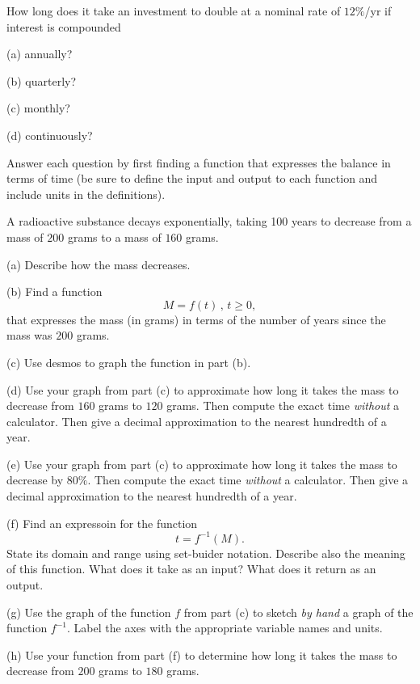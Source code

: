 \documentclass{ximera}
\begin{document}
\begin{question}  \label{Q:DLDFLLLLL}
How long does it take an investment to double at a nominal rate of $12\%$/yr if interest is compounded

(a) annually?

(b) quarterly?

(c) monthly?

(d) continuously?

Answer each question by first finding a function that expresses the balance in terms of time (be sure to define the input and output to each function and include units in the definitions).

\end{question}


\begin{question}  \label{Q:dfbhhhhh}
A radioactive substance decays exponentially, taking 100 years to decrease from a mass of $200$ grams to a mass of $160$ grams.

(a) Describe how the mass decreases.

(b)  Find a function 
\[
 M= f(t) \, , \, t\geq 0 ,
\]
that expresses the mass (in grams) in terms of the number of years since the mass was $200$ grams.

(c) Use desmos to graph the function in part (b). 

(d) Use your graph from part (c) to approximate how long it takes the mass to decrease from $160$ grams to $120$ grams. Then compute the exact time \emph{without} a calculator. Then give a decimal approximation to the nearest hundredth of a year.

(e) Use your graph from part (c) to approximate how long it takes the mass to decrease by $80\%$. Then compute the exact time \emph{without} a calculator. Then give a decimal approximation to the nearest hundredth of a year.

(f) Find an expressoin for the function 
\[ 
      t  = f^{-1}(M) .
\]
State its domain and range using set-buider notation. Describe also the meaning of this function. What does it take as an input? What does it return as an output.

(g) Use the graph of the function $f$ from part (c) to sketch \emph{by hand} a graph of the function $f^{-1}$. Label the axes with the appropriate variable names and units.

(h) Use your function from part (f) to determine how long it takes the mass to decrease from $200$ grams to $180$ grams.

\end{question}
\end{document}
